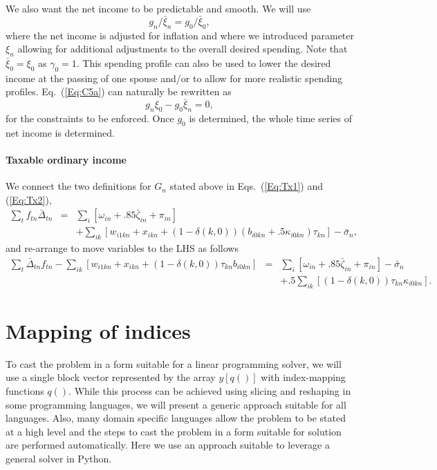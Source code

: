 \documentclass{article}[fleqn,12pt]
\begin{document}
	We also want the net income to be predictable and smooth. We will use
\begin{equation}
	\label{Eq:C5a}
	g_{n}/\bar{\xi}_{n} = g_0/\bar{\xi}_0,
\end{equation}
where the net income is adjusted for inflation and where we introduced parameter $\xi_n$ 
allowing for additional adjustments to the overall desired spending.
Note that $\bar{\xi}_0 = \xi_0$ as $\gamma_0=1$.
This spending profile can also be used to lower the desired income at the passing
of one spouse and/or to allow for more realistic spending profiles.
Eq.~(\ref{Eq:C5a}) can naturally be rewritten as
\begin{equation}
	\label{Eq:C5}
	g_n \xi_0 - g_0 \bar{\xi}_n = 0,
\end{equation}
for the constraints to be enforced. Once $g_0$ is determined, the whole time series of net income
is determined.

\paragraph*{Taxable ordinary income}
	We connect the two definitions for $G_n$ stated above in Eqs.~(\ref{Eq:Tx1}) and (\ref{Eq:Tx2}),
	\begin{eqnarray}
		\sum_t f_{t n}\bar{\Delta}_{t n} &=&
		\sum_i [\omega_{in} + .85\bar\zeta_{in} + \pi_{in}]  \nonumber \\
		&& + \sum_{ik} [w_{i1kn} + x_{ikn} + (1 - \delta(k, 0))(b_{i0kn} +
		.5\kappa_{i0kn})\tau_{kn}] - \bar{\sigma}_n,
	\end{eqnarray}
	and re-arrange to move variables to the LHS as follows
	\begin{eqnarray}
		\label{Eq:C6}
		\sum_t \bar{\Delta}_{t n} f_{t n}
		- \sum_{ik} [
			w_{i1kn} + x_{ikn} +
			(1 - \delta(k, 0))\tau_{kn}b_{i0kn}] &=&
		\sum_i [\omega_{in} + .85\bar\zeta_{in} + \pi_{in} ] 
		- \bar{\sigma}_n
		\nonumber \\
		&& + .5\sum_{ik} [(1-\delta(k, 0))\tau_{kn}\kappa_{i0kn}].
	\end{eqnarray}

\section{Mapping of indices}
To cast the problem in a form suitable for a linear programming solver, we will use
a single block vector represented by the array $y[q()]$ with index-mapping functions $q()$.
While this process can be achieved using slicing and reshaping in some programming
languages, we will present a generic approach suitable for all languages. Also,
many domain specific languages allow the problem to be stated at a high level and
the steps to cast the problem in a form suitable for solution are performed automatically.
Here we use an approach suitable to leverage a general solver in Python.
\end{document}

